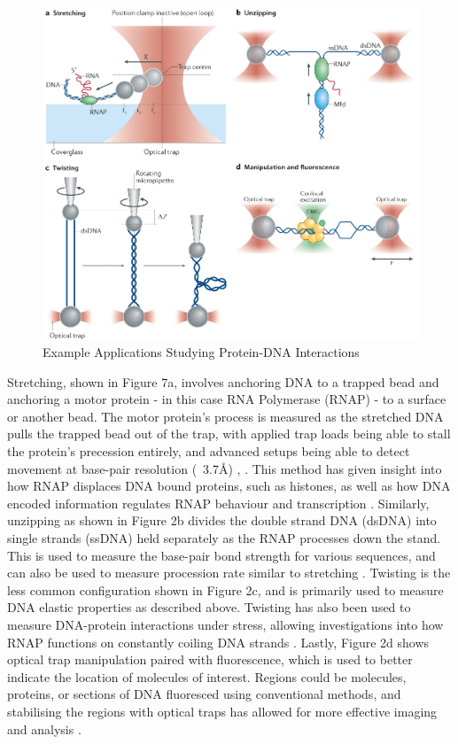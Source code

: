 \documentclass{article}
\begin{document}
\begin{figure}[h!]
    \begin{center}
    \includegraphics[width=\linewidth]{Pictures/applications.png}
    \caption{Example Applications Studying Protein-DNA Interactions}
    \label{fig:app}
    \end{center}
\end{figure}
\newpage

Stretching, shown in Figure 7a, involves anchoring DNA to a trapped bead and anchoring a motor protein - in this case RNA Polymerase (RNAP) - to a surface or another bead. The motor protein's process is measured as the stretched DNA pulls the trapped bead out of the trap, with applied trap loads being able to stall the protein's precession entirely, and advanced setups being able to detect movement at base-pair resolution (~3.7Å) \cite{Abbondanzieri2005}, \cite{science.1235441}. This method has given insight into how RNAP displaces DNA bound proteins, such as histones, as well as how DNA encoded information regulates RNAP behaviour and transcription \cite{Abbondanzieri2005}. Similarly, unzipping as shown in Figure 2b divides the double strand DNA (dsDNA) into single strands (ssDNA) held separately as the RNAP processes down the stand. This is used to measure the base-pair bond strength for various sequences, and can also be used to measure procession rate similar to stretching \cite{Bustamante2021}. Twisting is the less common configuration shown in Figure 2c, and is primarily used to measure DNA elastic properties as described above. Twisting has also been used to measure DNA-protein interactions under stress, allowing investigations into how RNAP functions on constantly coiling DNA strands \cite{science.1235441}. Lastly, Figure 2d shows optical trap manipulation paired with fluorescence, which is used to better indicate the location of molecules of interest. Regions could be molecules, proteins, or sections of DNA fluoresced using conventional methods, and stabilising the regions with optical traps has allowed for more effective imaging and analysis \cite{Harada1999-bb}.
\end{document}

